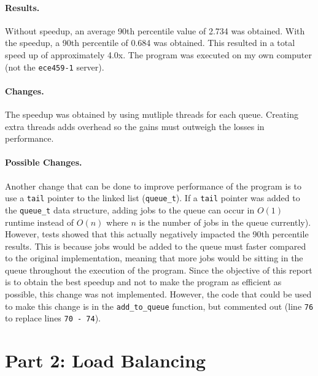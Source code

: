 \documentclass[12pt]{article}
\begin{document}
\paragraph{Results.} Without speedup, an average 90th percentile value of 2.734 was obtained. With the speedup, a 90th percentile of 0.684 was obtained. This resulted in a total speed up of approximately 4.0x. The program was executed on my own computer (not the {\tt ece459-1} server).

\paragraph{Changes.} The speedup was obtained by using mutliple threads for each queue. Creating extra threads adds overhead so the gains must outweigh the losses in performance.

\paragraph{Possible Changes.} Another change that can be done to improve performance of the program is to use a {\tt tail} pointer to the linked list ({\tt queue\_t}). If a {\tt tail} pointer was added to the {\tt queue\_t} data structure, adding jobs to the queue can occur in \( O(1) \) runtime instead of \( O(n) \) where \( n \) is the number of jobs in the queue currently). However, tests showed that this actually negatively impacted the 90th percentile results. This is because jobs would be added to the queue must faster compared to the original implementation, meaning that more jobs would be sitting in the queue throughout the execution of the program. Since the objective of this report is to obtain the best speedup and not to make the program as efficient as possible, this change was not implemented. However, the code that could be used to make this change is in the {\tt add\_to\_queue} function, but commented out (line {\tt 76} to replace lines {\tt 70 - 74}).

\pagebreak
\section*{Part 2: Load Balancing}
\end{document}
